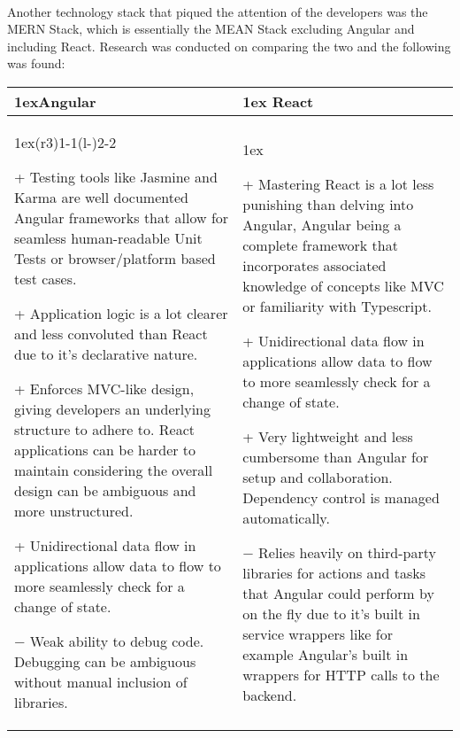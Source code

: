\paragraph{}
Another technology stack that piqued the attention of the developers was the MERN Stack, which is essentially the MEAN Stack excluding Angular and including React. Research was conducted on comparing the two \cite{MEAN_STACK_vs_MERN_STACK} and the following was found:

\begin{table}[htp]
\begin{tabularx}{\linewidth}{>{\parskip1ex}X@{\kern4\tabcolsep}>{\parskip1ex}X}
\toprule
\hfil\bfseries Angular
&
\hfil\bfseries React
\\\cmidrule(r{3\tabcolsep}){1-1}\cmidrule(l{-\tabcolsep}){2-2}

\begin{compactitem}[-]
\item[+] Testing tools like Jasmine and Karma are well documented Angular frameworks that allow for seamless human-readable Unit Tests or browser/platform based test cases.
\item[+] Application logic is a lot clearer and less convoluted than React due to it's declarative nature.
\item[+] Enforces MVC-like design, giving developers an underlying structure to adhere to. React applications can be harder to maintain considering the overall design can be ambiguous and more unstructured.
\item[+] Unidirectional data flow in applications allow data to flow to more seamlessly check for a change of state.
\item[$-$] Weak ability to debug code. Debugging can be ambiguous without manual inclusion of libraries.
\end{compactitem}
\par

&

\begin{compactitem}[-]
\item[+] Mastering React is a lot less punishing than delving into Angular, Angular being a complete framework that incorporates associated knowledge of concepts like MVC or familiarity with Typescript.
\item[+] Unidirectional data flow in applications allow data to flow to more seamlessly check for a change of state.
\item[+] Very lightweight and less cumbersome than Angular for setup and collaboration. Dependency control is managed automatically.
\item[$-$] Relies heavily on third-party libraries for actions and tasks that Angular could perform by on the fly due to it's built in service wrappers like for example Angular's built in wrappers for HTTP calls to the backend. 
\end{compactitem}


\end{tabularx}
\end{table}
